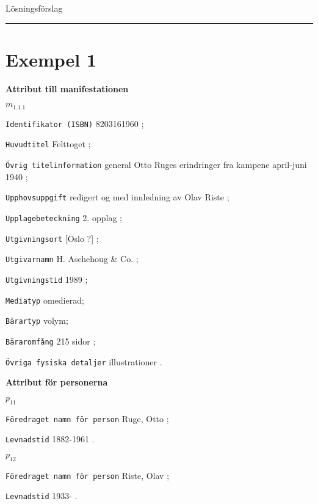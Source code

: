 \documentclass[a4,12pt]{article}
\begin{document}
\pagestyle{empty}

\Huge
\begin{center}
  Lösningsförslag \\ 


\rule{100mm}{.5mm}

\end{center}
\normalsize



\section{Exempel 1}
\label{sec:ex1}




\vspace{3mm}

\textbf{Attribut till manifestationen}

\noindent $m_{1.1.1}$

 \texttt{Identifikator (ISBN)} 8203161960 ;

 \texttt{Huvudtitel} Felttoget ;

\texttt{Övrig titelinformation} general Otto Ruges erindringer fra kampene april-juni
1940 ; 

\texttt{Upphovsuppgift} redigert og med innledning av Olav Riste ;

\texttt{Upplagebeteckning} 2. opplag ;

 \texttt{Utgivningsort} [Oslo ?] ;

 \texttt{Utgivarnamn} H. Aschehoug \& Co. ;

 \texttt{Utgivningstid} 1989 ;
 
  \texttt{Mediatyp}  omedierad;
 
 \texttt{Bärartyp}  volym;

\texttt{Bäraromfång} 215 sidor ;

\texttt{Övriga fysiska detaljer} illustrationer .



\vspace{3mm}

\textbf{Attribut för personerna}

\noindent ${p_11}$

   \texttt{Föredraget namn för person} Ruge, Otto ;

   \texttt{Levnadstid} 1882-1961 .

\noindent ${p_12}$

   \texttt{Föredraget namn för person} Riste, Olav ;

   \texttt{Levnadstid} 1933- .
\vspace{3mm}
\end{document}
